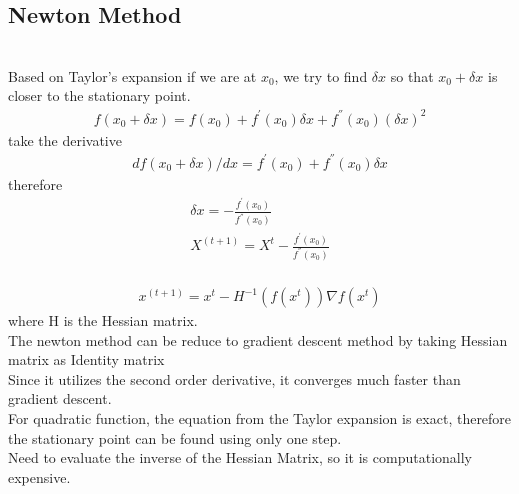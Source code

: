 \documentclass[a4paper]{article}
\begin{document}
\subsection{Newton Method}
\\
Based on Taylor's expansion if we are at $x_0$, we try to find $\delta x$ so that $x_0 + \delta x$ is closer to the stationary point.\\
\begin{align*}
	f(x_0 + \delta x ) = f(x_0) + f^{'}(x_0) \delta x + f^{''}(x_0) (\delta x) ^ 2
\end{align*}
take the derivative
\begin{align*}
	d f(x_0 + \delta x)/d x = f^{'}(x_0)  + f^{''}(x_0) \delta x
\end{align*}
therefore
\begin{align*}
	\delta x = - \frac{f^{'}(x_0)}{f^{''} (x_0)} \\
	X^{(t+1)} = X^{t}  - \frac{f^{'}(x_0)}{f^{''} (x_0)} \\
\end{align*}

\begin{align*}
	x^{(t+1)} = x^{t}  - H^{-1}(f(x^{t})) \nabla f(x^{t})
\end{align*}
 where H is the Hessian matrix.\\
 
The newton method can be reduce to gradient descent method by taking Hessian matrix as Identity matrix\\

Since it utilizes the second order derivative, it converges much faster than gradient descent.\\
For quadratic function, the equation from the Taylor expansion is exact, therefore the stationary point can be found using only one step.\\

Need to evaluate the inverse of the Hessian Matrix, so it is computationally expensive.\\
\end{document}

